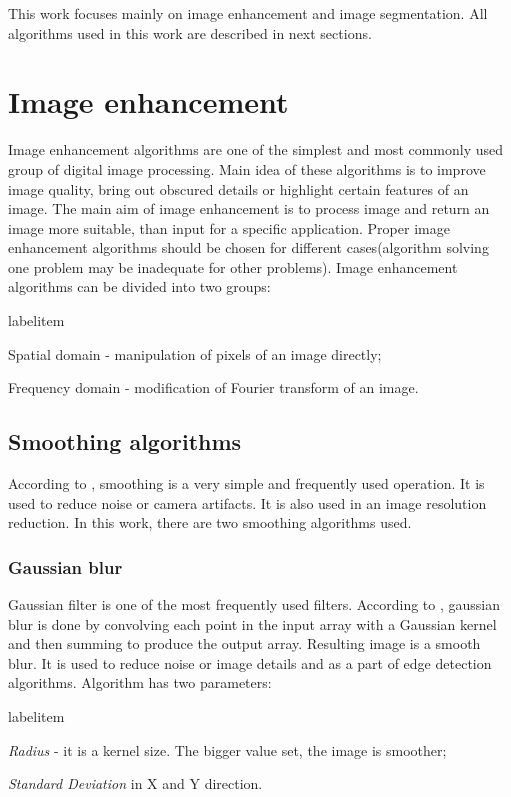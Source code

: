 \documentclass[a4paper,onecolumn,oneside,12pt]{memoir}
\makeatletter
\renewenvironment{itemize}{
  \begin{list}{  
  \csname labelitem\romannumeral\the\@listdepth\endcsname}{
  \setlength{\leftmargin}{1em}
	\setlength{\topsep}{6pt}%
	\setlength{\partopsep}{0pt}%
	\setlength{\parskip}{0pt}%
	\setlength{\parsep}{0pt}%
	\setlength{\itemsep}{0pt}}
}{
  \end{list}
}
\makeatother
\begin{document}
This work focuses mainly on image enhancement and image segmentation. All algorithms used in this 
work are described in next sections.

\section{Image enhancement}

Image enhancement algorithms are one of the simplest and most commonly used group of digital image
processing. Main idea of these algorithms is to improve image quality, bring out obscured details 
or highlight certain features of an image.  The main aim of image enhancement is to process image 
and return an image more suitable, than input for a specific application. Proper image enhancement
algorithms should be chosen for different cases(algorithm solving one problem may be inadequate for
other problems). Image enhancement algorithms can be divided into two groups:

\begin{itemize}
  \item Spatial domain - manipulation of pixels of an image directly;
  \item Frequency domain - modification of Fourier transform of an image.
\end{itemize}

\subsection{Smoothing algorithms}

According to \cite{learningOpenCv}, smoothing is a very simple and frequently used operation. It is
used to reduce noise or camera artifacts. It is also used in an image resolution reduction. In this
work, there are two smoothing algorithms used.

\subsubsection{Gaussian blur}

Gaussian filter is one of the most frequently used filters. According to \cite{learningOpenCv}, 
gaussian blur is done by convolving each point in the input array with a Gaussian kernel and then
summing to produce the output array. Resulting image is a smooth blur. It is used to reduce noise
or image details and as a part of edge detection algorithms. Algorithm has two parameters:

\begin{itemize}
  \item \textit{Radius} - it is a kernel size. The bigger value set, the image is smoother;
  \item \textit{Standard Deviation} in X and Y direction.
\end{itemize}
\end{document}
